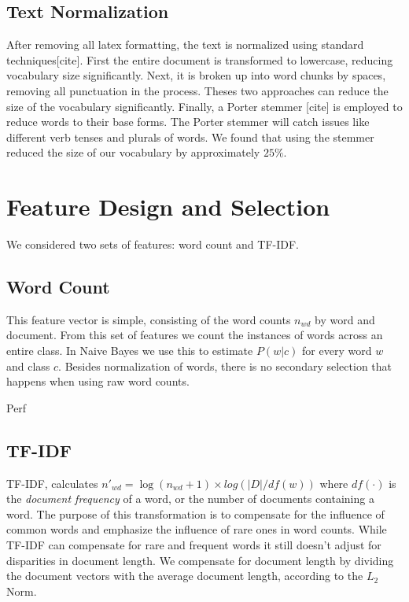 \documentclass[10pt,twocolumn]{article}
\begin{document}
\subsection*{Text Normalization}

After removing all latex formatting, the text is normalized using standard techniques[cite]. First the entire document is transformed to lowercase, reducing vocabulary size significantly. Next, it is broken up into word chunks by spaces, removing all punctuation in the process. Theses two approaches can reduce the size of the vocabulary significantly. Finally, a Porter stemmer [cite] is employed to reduce words to their base forms. The Porter stemmer will catch issues like different verb tenses and plurals of words. We found that using the stemmer reduced the size of our vocabulary by approximately $25\%$. 

\section*{Feature Design and Selection}

We considered two sets of features: word count and TF-IDF. 

\subsection*{Word Count}

This feature vector is simple, consisting of the word counts $n_{wd}$ by word and document. From this set of features we count the instances of words across an entire class. In Naive Bayes we use this to estimate $P(w | c)$ for every word $w$ and class $c$. Besides normalization of words, there is no secondary selection that happens when using raw word counts. 

Perf

\subsection*{TF-IDF}

TF-IDF, calculates $n'_{wd} = \log (n_{wd} + 1) \times log (|D| / df(w))$ where $df(\cdot)$ is the \emph{document frequency} of a word, or the number of documents containing a word. The purpose of this transformation is to compensate for the influence of common words and emphasize the influence of rare ones in word counts. While TF-IDF can compensate for rare and frequent words it still doesn't adjust for disparities in document length. We compensate for document length by dividing the document vectors with the average document length, according to the $L_2$ Norm.
\end{document}
